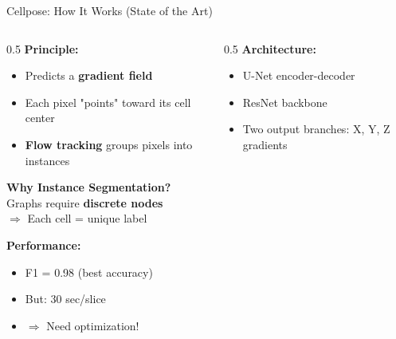 \documentclass[aspectratio=169]{beamer}
\begin{document}
\begin{frame}{Cellpose: How It Works (State of the Art)}
    \begin{columns}
        \begin{column}{0.5\textwidth}
            \textbf{Principle:}
            \begin{itemize}
                \item Predicts a \textbf{gradient field}
                \item Each pixel "points" toward its cell center
                \item \textbf{Flow tracking} groups pixels into instances
            \end{itemize}
            
            \vspace{0.5em}
            \textbf{Why Instance Segmentation?}\\
            Graphs require \textbf{discrete nodes}\\
            $\Rightarrow$ Each cell = unique label

            \vspace{1em}
            \textbf{Performance:}
            \begin{itemize}
                \item F1 = 0.98 (best accuracy)
                \item But: 30 sec/slice
                \item $\Rightarrow$ Need optimization!
            \end{itemize}
        \end{column}
        \begin{column}{0.5\textwidth}
            \textbf{Architecture:}
            \begin{itemize}
                \item U-Net encoder-decoder
                \item ResNet backbone
                \item Two output branches: X, Y, Z gradients
            \end{itemize}
            \vspace{1em}
        \end{column}
    \end{columns}
\end{frame}
\end{document}
